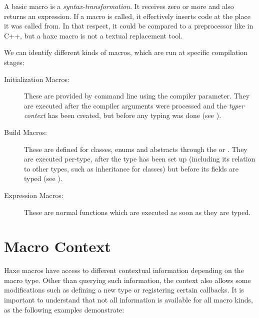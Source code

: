 \documentclass{haxe}
\begin{document}

A basic macro is a \emph{syntax-transformation}. It receives zero or more  and also returns an expression. If a macro is called, it effectively inserts code at the place it was called from. In that respect, it could be compared to a preprocessor like  in C++, but a haxe macro is not a textual replacement tool.

We can identify different kinds of macros, which are run at specific compilation stages:

\begin{description}
	\item[Initialization Macros:] These are provided by command line using the  compiler parameter. They are executed after the compiler arguments were processed and the \emph{typer context} has been created, but before any typing was done (see ).
	\item[Build Macros:] These are defined for classes, enums and abstracts through the  or  . They are executed per-type, after the type has been set up (including its relation to other types, such as inheritance for classes) but before its fields are typed (see ).
	\item[Expression Macros:] These are normal functions which are executed as soon as they are typed.
\end{description}
	
\section{Macro Context}
\label{macro-context}


Haxe macros have access to different contextual information depending on the macro type. Other than querying such information, the context also allows some modifications such as defining a new type or registering certain callbacks. It is important to understand that not all information is available for all macro kinds, as the following examples demonstrate:
\end{document}
